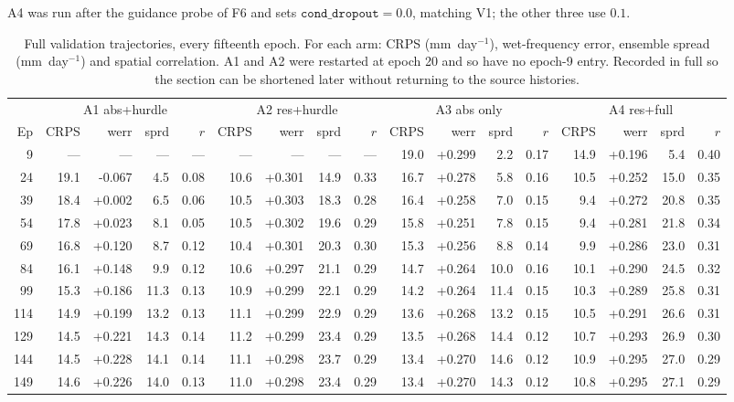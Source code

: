 A4 was run after the guidance probe of F6 and sets
$\texttt{cond\_dropout}=0.0$, matching V1; the other three use $0.1$.

\begin{table}[htbp]
\centering
\caption{Full validation trajectories, every fifteenth epoch. For each arm:
CRPS (mm~day$^{-1}$), wet-frequency error, ensemble spread (mm~day$^{-1}$) and
spatial correlation. A1 and A2 were restarted at epoch 20 and so have no epoch-9
entry. Recorded in full so the section can be shortened later without returning
to the source histories.}
\label{tab:ablation-trajectories}
\small
\begin{tabular}{r|rrrr|rrrr|rrrr|rrrr}
\hline
 & \multicolumn{4}{c|}{A1 abs+hurdle} & \multicolumn{4}{c|}{A2 res+hurdle}
 & \multicolumn{4}{c|}{A3 abs only} & \multicolumn{4}{c}{A4 res+full} \\
Ep & CRPS & werr & sprd & $r$ & CRPS & werr & sprd & $r$ & CRPS & werr & sprd & $r$ & CRPS & werr & sprd & $r$ \\
\hline
9 & --- & --- & --- & --- & --- & --- & --- & --- & 19.0 & +0.299 & 2.2 & 0.17 & 14.9 & +0.196 & 5.4 & 0.40 \\
24 & 19.1 & -0.067 & 4.5 & 0.08 & 10.6 & +0.301 & 14.9 & 0.33 & 16.7 & +0.278 & 5.8 & 0.16 & 10.5 & +0.252 & 15.0 & 0.35 \\
39 & 18.4 & +0.002 & 6.5 & 0.06 & 10.5 & +0.303 & 18.3 & 0.28 & 16.4 & +0.258 & 7.0 & 0.15 & 9.4 & +0.272 & 20.8 & 0.35 \\
54 & 17.8 & +0.023 & 8.1 & 0.05 & 10.5 & +0.302 & 19.6 & 0.29 & 15.8 & +0.251 & 7.8 & 0.15 & 9.4 & +0.281 & 21.8 & 0.34 \\
69 & 16.8 & +0.120 & 8.7 & 0.12 & 10.4 & +0.301 & 20.3 & 0.30 & 15.3 & +0.256 & 8.8 & 0.14 & 9.9 & +0.286 & 23.0 & 0.31 \\
84 & 16.1 & +0.148 & 9.9 & 0.12 & 10.6 & +0.297 & 21.1 & 0.29 & 14.7 & +0.264 & 10.0 & 0.16 & 10.1 & +0.290 & 24.5 & 0.32 \\
99 & 15.3 & +0.186 & 11.3 & 0.13 & 10.9 & +0.299 & 22.1 & 0.29 & 14.2 & +0.264 & 11.4 & 0.15 & 10.3 & +0.289 & 25.8 & 0.31 \\
114 & 14.9 & +0.199 & 13.2 & 0.13 & 11.1 & +0.299 & 22.9 & 0.29 & 13.6 & +0.268 & 13.2 & 0.15 & 10.5 & +0.291 & 26.6 & 0.31 \\
129 & 14.5 & +0.221 & 14.3 & 0.14 & 11.2 & +0.299 & 23.4 & 0.29 & 13.5 & +0.268 & 14.4 & 0.12 & 10.7 & +0.293 & 26.9 & 0.30 \\
144 & 14.5 & +0.228 & 14.1 & 0.14 & 11.1 & +0.298 & 23.7 & 0.29 & 13.4 & +0.270 & 14.6 & 0.12 & 10.9 & +0.295 & 27.0 & 0.29 \\
149 & 14.6 & +0.226 & 14.0 & 0.13 & 11.0 & +0.298 & 23.4 & 0.29 & 13.4 & +0.270 & 14.3 & 0.12 & 10.8 & +0.295 & 27.1 & 0.29 \\
\hline
\end{tabular}
\end{table}

